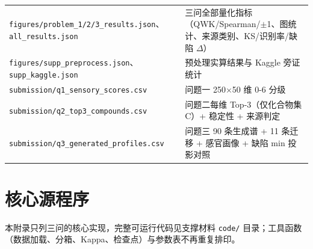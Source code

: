 \documentclass[zihao=-4,a4paper,UTF8,fontset=none]{ctexart}
\begin{document}
{\begin{longtable}{@{}p{}p{}@{}}
\texttt{figures/problem\_\allowbreak{}1/2/3\_\allowbreak{}results.json}、\texttt{all\_\allowbreak{}results.json} & 三问全部量化指标（QWK/Spearman/$\pm$1、图统计、来源类别、KS/识别率/缺陷 $\Delta$） \\
\texttt{figures/supp\_\allowbreak{}preprocess.json}、\texttt{supp\_\allowbreak{}kaggle.json} & 预处理实算结果与 Kaggle 旁证统计 \\
\texttt{submission/q1\_\allowbreak{}sensory\_\allowbreak{}scores.csv} & 问题一 250$\times$50 维 0-6 分级 \\
\texttt{submission/q2\_\allowbreak{}top3\_\allowbreak{}compounds.csv} & 问题二每维 Top-3（仅化合物集 C）+ 稳定性 + 来源判定 \\
\texttt{submission/q3\_\allowbreak{}generated\_\allowbreak{}profiles.csv} & 问题三 90 条生成谱 + 11 条迁移 + 感官画像 + 缺陷 min 投影对照 \\
\end{longtable}}

\section{核心源程序}

本附录只列三问的核心实现，完整可运行代码见支撑材料 \texttt{code/} 目录；工具函数（数据加载、分箱、Kappa、检查点）与参数表不再重复排印。
\end{document}
